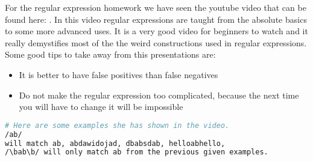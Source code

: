 For the regular expression homework we have seen the youtube video that can be found here: \cite{leaverou1}. In this video regular expressions are taught from the absolute basics to some more advanced uses. It is a very good video for beginners to watch and it really demystifies most of the the weird constructions used in regular expressions. Some good tips to take away from this presentations are:
\begin{itemize}
\item It is better to have false positives than false negatives
\item Do not make the regular expression too complicated, because the next time you will have to change it will be impossible
\end{itemize}
\begin{lstlisting}[language=bash,label=lst:exampleregex,caption=Regex examples]
# Here are some examples she has shown in the video.
/ab/
will match ab, abdawidojad, dbabsdab, helloabhello,
/\bab\b/ will only match ab from the previous given examples.

\end{lstlisting}